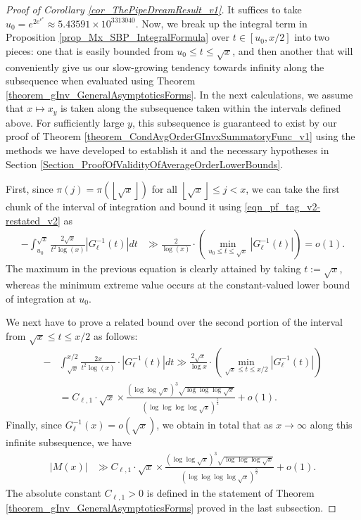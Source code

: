 \documentclass[11pt,reqno,a4letter]{article}
\numberwithin{figure}{section}
\numberwithin{table}{section}
\newcommand{\floor}[1]{\left\lfloor #1 \right\rfloor}
\theoremstyle{plain}
\numberwithin{theorem}{section}
\theoremstyle{definition}
\newcommand{\SuccSim}[0]{\overset{_{\scriptsize{\blacktriangle}}}{\succsim}}
\renewcommand{\SuccSim}[0]{\ensuremath{\gg}}
\begin{document}
\begin{proof}[Proof of Corollary \ref{cor_ThePipeDreamResult_v1}] 
\label{proofOf_cor_ThePipeDreamResult_v1} 
It suffices to take $u_0 = e^{2e^{e^{e}}} \approx 5.43591 \times 10^{3313040}$. 
Now, we break up the integral term in 
Proposition \ref{prop_Mx_SBP_IntegralFormula} 
over $t \in [u_0, x/2]$ into two pieces: one that is easily bounded 
from $u_0 \leq t \leq \sqrt{x}$, 
and then another that will conveniently give us our slow-growing tendency towards 
infinity along the subsequence when evaluated using 
Theorem \ref{theorem_gInv_GeneralAsymptoticsForms}. 
In the next calculations, we assume that $x \mapsto x_y$ is taken along the 
subsequence taken within the intervals defined above. 
For sufficiently large $y$, this subsequence is guaranteed to exist by our proof of 
Theorem \ref{theorem_CondAvgOrderGInvxSummatoryFunc_v1} 
using the methods we have developed to establish it and the necessary hypotheses in 
Section \ref{Section_ProofOfValidityOfAverageOrderLowerBounds}. 

First, since $\pi(j) = \pi(\floor{\sqrt{x}})$ for all 
$\floor{\sqrt{x}} \leq j < x$, we can take the first chunk 
of the interval of integration and bound it using \eqref{eqn_pf_tag_v2-restated_v2} as 
\begin{align*} 
-\int_{u_0}^{\sqrt{x}} \frac{2\sqrt{x}}{t^2 \log(x)} |G_{\ell}^{-1}(t)| dt & \SuccSim 
     \frac{2}{\log(x)} \cdot \left(\min\limits_{u_0 \leq t \leq \sqrt{x}} 
     |G_{\ell}^{-1}(t)| 
     \right) = o\left(1\right). 
\end{align*} 
The maximum in the previous equation is clearly attained by taking $t := \sqrt{x}$, whereas the minimum extreme value 
occurs at the constant-valued lower bound of integration at $u_0$. 

We next have to prove a related bound over the second portion of the interval from 
$\sqrt{x} \leq t \leq x/2$ as follows: 
\begin{align*} 
- & \int_{\sqrt{x}}^{x/2} \frac{2 x}{t^2 \log(x)} \cdot |G_{\ell}^{-1}(t)| dt \SuccSim 
     \frac{2\sqrt{x}}{\log x} \cdot \left(\min_{\sqrt{x} \leq t \leq x/2} |G_{\ell}^{-1}(t)|\right) \\ 
     & = C_{\ell,1} \cdot \sqrt{x} \times 
      \frac{(\log\log \sqrt{x})^{3} \sqrt{\log\log\log \sqrt{x}}}{ 
     (\log\log\log\log \sqrt{x})^{\frac{5}{2}}} + o(1). 
\end{align*} 
Finally, since $G_{\ell}^{-1}(x) = o(\sqrt{x})$, we obtain in total that as 
$x \rightarrow \infty$ along this infinite subsequence, we have 
\begin{align*} 
|M(x)| & \SuccSim 
     C_{\ell,1} \cdot \sqrt{x} \times 
     \frac{(\log\log \sqrt{x})^{3} \sqrt{\log\log\log \sqrt{x}}}{ 
     (\log\log\log\log \sqrt{x})^{\frac{5}{2}}} + o(1).  
\end{align*} 
The absolute constant $C_{\ell,1} > 0$ is defined in the statement of 
Theorem \ref{theorem_gInv_GeneralAsymptoticsForms} proved in the last subsection. 
\end{proof} 
\end{document}
